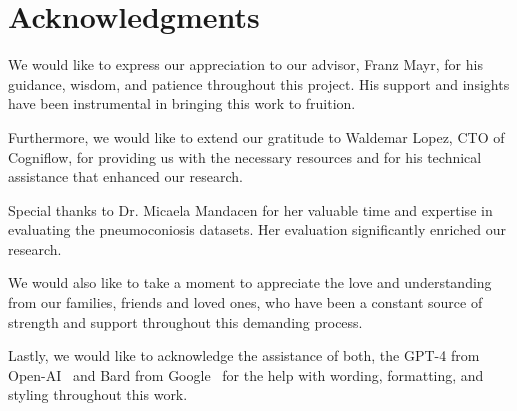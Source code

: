 \chapter{Acknowledgments}

We would like to express our appreciation to our advisor, Franz Mayr, for his guidance, wisdom, and patience throughout this project. His support and insights have been instrumental in bringing this work to fruition.

Furthermore, we would like to extend our gratitude to Waldemar Lopez, CTO of Cogniflow, for providing us with the necessary resources and for his technical assistance that enhanced our research.

Special thanks to Dr. Micaela Mandacen for her valuable time and expertise in evaluating the pneumoconiosis datasets. Her evaluation significantly enriched our research.

We would also like to take a moment to appreciate the love and understanding from our families, friends and loved ones, who have been a constant source of strength and support throughout this demanding process. 

Lastly, we would like to acknowledge the assistance of both, the GPT-4 from Open-AI~\cite{gpt4} and Bard from Google~\cite{bard} for the help with wording, formatting, and styling throughout this work.